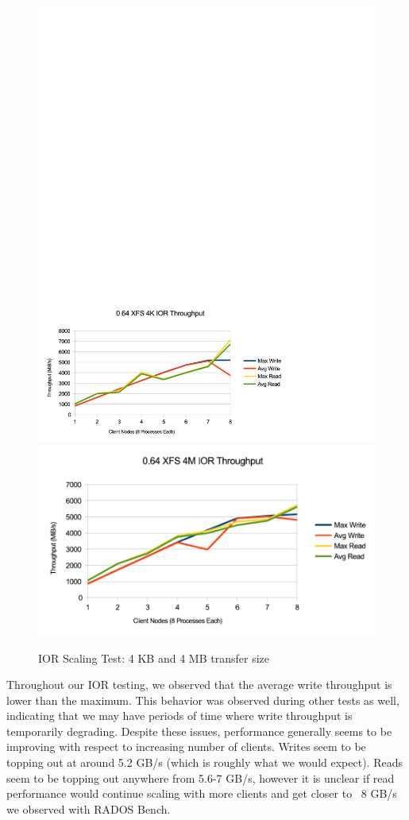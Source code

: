 \documentclass{article}
\begin{document}
\begin{figure}[htb]
\centering
\includegraphics[width=5in]{ior-064-4k}
\includegraphics[width=5in]{ior-064-4m}
\caption{IOR Scaling Test: 4 KB and 4 MB transfer size}
\label{fig:ior-064}
\end{figure}

Throughout our IOR testing, we observed that the average write throughput is 
lower than the maximum.  This behavior was observed during other tests as well,
indicating that we may have periods of time where write throughput is
temporarily degrading.  Despite these issues, performance generally seems to be
improving with respect to increasing number of clients.  Writes seem to be topping out at
around 5.2 GB/s (which is roughly what we would expect).  Reads seem to be
topping out anywhere from 5.6-7 GB/s, however it is unclear if read performance
would continue scaling with more clients and get closer to ~8 GB/s  we
observed with RADOS Bench.
\end{document}
